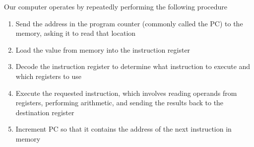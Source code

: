 \documentclass[8pt,a4paper,compress]{beamer}
\begin{document}
\begin{frame}[fragile]
\pause

Our computer operates by repeatedly performing the following procedure
\begin{enumerate}
\item Send the address in the program counter (commonly called the PC) to the memory, asking it to read that location

\item Load the value from memory into the instruction register

\item Decode the instruction register to determine what instruction to execute and which registers to use

\item Execute the requested instruction, which involves reading operands from registers, performing arithmetic, and sending the results back to the destination register

\item Increment PC so that it contains the address of the next instruction in memory
\end{enumerate}

\begin{center}
\end{center}
\end{frame}
\end{document}
